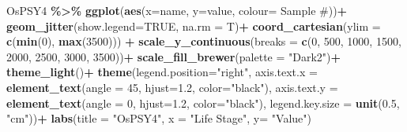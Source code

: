 \documentclass[
]{article}
\newenvironment{Shaded}{\begin{snugshade}}{\end{snugshade}}
\newcommand{\AttributeTok}[1]{\textcolor[rgb]{0.13,0.29,0.53}{#1}}
\newcommand{\ConstantTok}[1]{\textcolor[rgb]{0.56,0.35,0.01}{#1}}
\newcommand{\DecValTok}[1]{\textcolor[rgb]{0.00,0.00,0.81}{#1}}
\newcommand{\FloatTok}[1]{\textcolor[rgb]{0.00,0.00,0.81}{#1}}
\newcommand{\FunctionTok}[1]{\textcolor[rgb]{0.13,0.29,0.53}{\textbf{#1}}}
\newcommand{\NormalTok}[1]{#1}
\newcommand{\SpecialCharTok}[1]{\textcolor[rgb]{0.81,0.36,0.00}{\textbf{#1}}}
\newcommand{\StringTok}[1]{\textcolor[rgb]{0.31,0.60,0.02}{#1}}
\begin{document}
\begin{Shaded}
\begin{Highlighting}[]
\NormalTok{ OsPSY4 }\SpecialCharTok{\%\textgreater{}\%} 
  \FunctionTok{ggplot}\NormalTok{(}\FunctionTok{aes}\NormalTok{(}\AttributeTok{x=}\NormalTok{name, }\AttributeTok{y=}\NormalTok{value, }\AttributeTok{colour=} \StringTok{\textasciigrave{}}\AttributeTok{Sample \#}\StringTok{\textasciigrave{}}\NormalTok{))}\SpecialCharTok{+}
  \FunctionTok{geom\_jitter}\NormalTok{(}\AttributeTok{show.legend=}\ConstantTok{TRUE}\NormalTok{, }\AttributeTok{na.rm =}\NormalTok{ T)}\SpecialCharTok{+}
  \FunctionTok{coord\_cartesian}\NormalTok{(}\AttributeTok{ylim =} \FunctionTok{c}\NormalTok{(}\FunctionTok{min}\NormalTok{(}\DecValTok{0}\NormalTok{), }\FunctionTok{max}\NormalTok{(}\DecValTok{3500}\NormalTok{))) }\SpecialCharTok{+}
  \FunctionTok{scale\_y\_continuous}\NormalTok{(}\AttributeTok{breaks =} \FunctionTok{c}\NormalTok{(}\DecValTok{0}\NormalTok{, }\DecValTok{500}\NormalTok{, }\DecValTok{1000}\NormalTok{, }\DecValTok{1500}\NormalTok{, }\DecValTok{2000}\NormalTok{, }\DecValTok{2500}\NormalTok{, }\DecValTok{3000}\NormalTok{, }\DecValTok{3500}\NormalTok{))}\SpecialCharTok{+}
  \FunctionTok{scale\_fill\_brewer}\NormalTok{(}\AttributeTok{palette =} \StringTok{"Dark2"}\NormalTok{)}\SpecialCharTok{+}
  \FunctionTok{theme\_light}\NormalTok{()}\SpecialCharTok{+}
  \FunctionTok{theme}\NormalTok{(}\AttributeTok{legend.position=}\StringTok{"right"}\NormalTok{, }
        \AttributeTok{axis.text.x =} \FunctionTok{element\_text}\NormalTok{(}\AttributeTok{angle =} \DecValTok{45}\NormalTok{, }\AttributeTok{hjust=}\FloatTok{1.2}\NormalTok{, }\AttributeTok{color=}\StringTok{"black"}\NormalTok{), }
        \AttributeTok{axis.text.y =} \FunctionTok{element\_text}\NormalTok{(}\AttributeTok{angle =} \DecValTok{0}\NormalTok{, }\AttributeTok{hjust=}\FloatTok{1.2}\NormalTok{, }\AttributeTok{color=}\StringTok{"black"}\NormalTok{), }
        \AttributeTok{legend.key.size =} \FunctionTok{unit}\NormalTok{(}\FloatTok{0.5}\NormalTok{, }\StringTok{"cm"}\NormalTok{))}\SpecialCharTok{+}
  \FunctionTok{labs}\NormalTok{(}\AttributeTok{title =} \StringTok{"OsPSY4"}\NormalTok{,}
       \AttributeTok{x =} \StringTok{"Life Stage"}\NormalTok{,}
       \AttributeTok{y=} \StringTok{"Value"}\NormalTok{)}
\end{Highlighting}
\end{Shaded}
\end{document}
